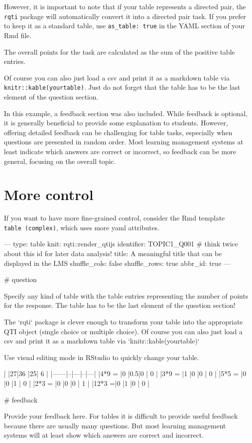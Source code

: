 \documentclass[twoside]{tufte-book}
\newenvironment{Shaded}{}{}
\begin{document}
However, it is important to note that if your table represents a directed pair, the \texttt{rqti} package will automatically convert it into a directed pair task. If you prefer to keep it as a standard table, use \texttt{as\_table:\ true} in the YAML section of your Rmd file.

The overall points for the task are calculated as the sum of the positive table entries.

Of course you can also just load a csv and print it as a markdown table via \texttt{knitr::kable(yourtable)}. Just do not forget that the table has to be the last element of the question section.

In this example, a feedback section was also included. While feedback is optional, it is generally beneficial to provide some explanation to students. However, offering detailed feedback can be challenging for table tasks, especially when questions are presented in random order. Most learning management systems at least indicate which answers are correct or incorrect, so feedback can be more general, focusing on the overall topic.

\section{More control}\label{more-control-7}

If you want to have more fine-grained control, consider the Rmd template \texttt{table\ (complex)}, which uses more yaml attributes.

\begin{Shaded}
\begin{Highlighting}
---
type: table
knit: rqti::render_qtijs
identifier: TOPIC1_Q001 # think twice about this id for later data analysis!
title: A meaningful title that can be displayed in the LMS
shuffle_cols: false
shuffle_rows: true
abbr_id: true
---

# question

Specify any kind of table with the table entries representing the number of
points for the response. The table has to be the last element of the question
section!

The `rqti` package is clever enough to transform your table into the appropriate
QTI object (single choice or multiple choice). Of course you can also just load
a csv and print it as a markdown table via `knitr::kable(yourtable)`

Use visual editing mode in RStudio to quickly change your table.

|      |27|36 |25| 6 |
|------|--|---|--|---|
|4*9 = |0 |0.5|0 | 0 |
|3*9 = |1 |0  |0 | 0 |
|5*5 = |0 |0  |1 | 0 |
|2*3 = |0 |0  |0 | 1 |
|12*3 =|0 |1  |0 | 0 |


# feedback

Provide your feedback here. For tables it is difficult to provide useful
feedback because there are usually many questions. But most learning management
systems will at least show which answers are correct and incorrect.
\end{Highlighting}
\end{Shaded}
\end{document}
